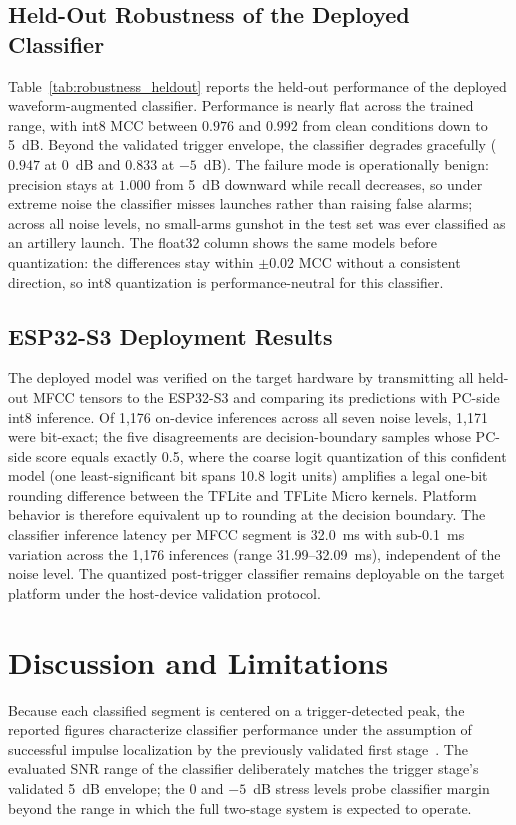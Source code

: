 ﻿\documentclass[conference]{IEEEtran}
\begin{document}


\subsection{Held-Out Robustness of the Deployed Classifier}
Table~\ref{tab:robustness_heldout} reports the held-out performance of the deployed waveform-augmented classifier. Performance is nearly flat across the trained range, with int8 MCC between $0.976$ and $0.992$ from clean conditions down to 5~dB. Beyond the validated trigger envelope, the classifier degrades gracefully ($0.947$ at 0~dB and $0.833$ at $-5$~dB). The failure mode is operationally benign: precision stays at $1.000$ from 5~dB downward while recall decreases, so under extreme noise the classifier misses launches rather than raising false alarms; across all noise levels, no small-arms gunshot in the test set was ever classified as an artillery launch. The float32 column shows the same models before quantization: the differences stay within $\pm 0.02$ MCC without a consistent direction, so int8 quantization is performance-neutral for this classifier.



\subsection{ESP32-S3 Deployment Results}
The deployed model was verified on the target hardware by transmitting all held-out MFCC tensors to the ESP32-S3 and comparing its predictions with PC-side int8 inference. Of 1,176 on-device inferences across all seven noise levels, 1,171 were bit-exact; the five disagreements are decision-boundary samples whose PC-side score equals exactly 0.5, where the coarse logit quantization of this confident model (one least-significant bit spans 10.8 logit units) amplifies a legal one-bit rounding difference between the TFLite and TFLite Micro kernels. Platform behavior is therefore equivalent up to rounding at the decision boundary. The classifier inference latency per MFCC segment is 32.0~ms with sub-0.1~ms variation across the 1,176 inferences (range 31.99--32.09~ms), independent of the noise level. The quantized post-trigger classifier remains deployable on the target platform under the host-device validation protocol.

\section{Discussion and Limitations}
Because each classified segment is centered on a trigger-detected peak, the reported figures characterize classifier performance under the assumption of successful impulse localization by the previously validated first stage~\cite{svatos2019smart_acoustic_sensor}. The evaluated SNR range of the classifier deliberately matches the trigger stage's validated 5~dB envelope; the 0 and $-5$~dB stress levels probe classifier margin beyond the range in which the full two-stage system is expected to operate.
\end{document}
